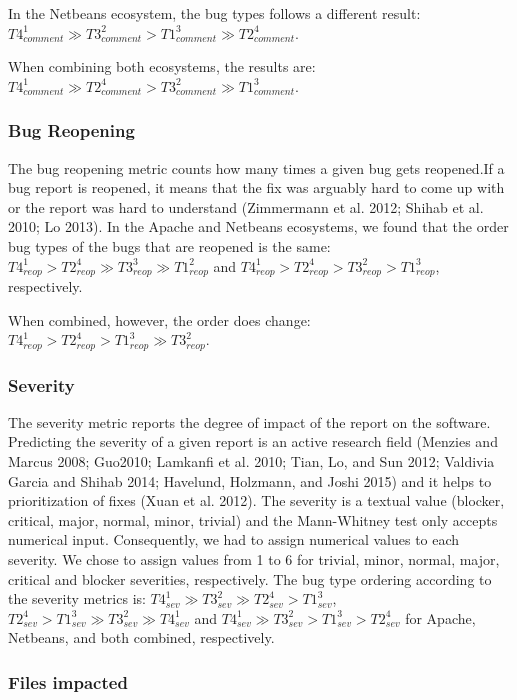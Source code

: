 \documentclass[natbib]{svjour3}
\begin{document}
In the Netbeans ecosystem, the bug types follows a different result:
\(T4_{comment}^1 \gg T3_{comment}^2 > T1_{comment}^3 \gg T2_{comment}^4\).

When combining both ecosystems, the results are:
\(T4_{comment}^1 \gg T2_{comment}^4 > T3_{comment}^2 \gg T1_{comment}^3\).

\subsubsection{Bug Reopening}\label{bug-reopening}

The bug reopening metric counts how many times a given bug gets
reopened.If a bug report is reopened, it means that the fix was arguably
hard to come up with or the report was hard to understand (Zimmermann et
al. 2012; Shihab et al. 2010; Lo 2013). In the Apache and Netbeans
ecosystems, we found that the order bug types of the bugs that are
reopened is the same:
\(T4_{reop}^1 > T2_{reop}^4 \gg T3_{reop}^3 \gg T1_{reop}^2\) and
\(T4_{reop}^1 > T2_{reop}^4 > T3_{reop}^2 > T1_{reop}^3\), respectively.

When combined, however, the order does change:
\(T4_{reop}^1 > T2_{reop}^4 > T1_{reop}^3 \gg T3_{reop}^2\).

\subsubsection{Severity}\label{severity}

The severity metric reports the degree of impact of the report on the
software. Predicting the severity of a given report is an active
research field (Menzies and Marcus 2008; Guo2010; Lamkanfi et al. 2010;
Tian, Lo, and Sun 2012; Valdivia Garcia and Shihab 2014; Havelund,
Holzmann, and Joshi 2015) and it helps to prioritization of fixes (Xuan
et al. 2012). The severity is a textual value (blocker, critical, major,
normal, minor, trivial) and the Mann-Whitney test only accepts numerical
input. Consequently, we had to assign numerical values to each severity.
We chose to assign values from 1 to 6 for trivial, minor, normal, major,
critical and blocker severities, respectively. The bug type ordering
according to the severity metrics is:
\(T4_{sev}^1 \gg T3_{sev}^2 \gg T2_{sev}^4 > T1_{sev}^3\),
\(T2_{sev}^4 > T1_{sev}^3 \gg T3_{sev}^2 \gg T4_{sev}^1\) and
\(T4_{sev}^1 \gg T3_{sev}^2 > T1_{sev}^3 > T2_{sev}^4\) for Apache,
Netbeans, and both combined, respectively.

\subsubsection{Files impacted}\label{files-impacted}
\end{document}
